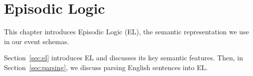 \chapter{Episodic Logic}

This chapter introduces Episodic Logic (EL), the semantic representation we use in our event schemas.

Section~\ref{sec:el} introduces EL and discusses its key semantic features. Then, in Section~\ref{sec:parsing}, we discuss parsing English sentences into EL.


%






